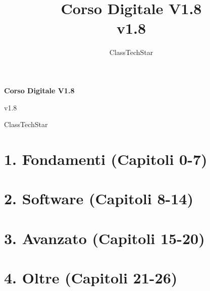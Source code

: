 \documentclass[11pt,a4paper,openany]{book}
\title{Corso Digitale V1.8\\ \large v1.8}
\author{ClassTechStar}
\date{}
\begin{document}
\begin{titlepage}
\centering
\vspace*{0.28\textheight}
{\Huge\bfseries Corso Digitale V1.8\par}
\vspace{1.2em}
{\Large v1.8\par}
\vfill
{\large ClassTechStar\par}
\end{titlepage}
\frontmatter
\tableofcontents
\mainmatter
\part*{1. Fondamenti (Capitoli 0-7)}










\part*{2. Software (Capitoli 8-14)}








\part*{3. Avanzato (Capitoli 15-20)}







\part*{4. Oltre (Capitoli 21-26)}







\end{document}
